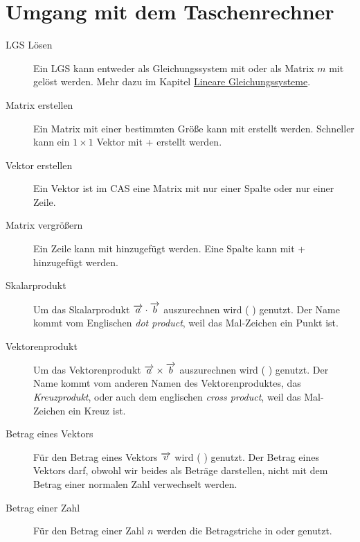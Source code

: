 \documentclass{article}
\begin{document}
\section{Umgang mit dem Taschenrechner}
\begin{description}
 \item[LGS Lösen] Ein LGS kann entweder als Gleichungssystem mit  \arrow {} \arrow {} \arrow {} oder als Matrix $m$ mit  gelöst werden. Mehr dazu im Kapitel \hyperref[Lineare Gleichungssysteme]{Lineare Gleichungssysteme}.
 \item[Matrix erstellen] Ein Matrix mit einer bestimmten Größe kann mit  \arrow {} \arrow {} \arrow {} erstellt werden. Schneller kann ein $1 \times 1$ Vektor mit  + \calckey{(} erstellt werden.
 \item[Vektor erstellen] Ein Vektor ist im CAS eine Matrix mit nur einer Spalte oder nur einer Zeile.  
 \item[Matrix vergrößern] Ein Zeile kann mit \calckey{\return} hinzugefügt werden. Eine Spalte kann mit  + \calckey{\return} hinzugefügt werden.
 \item[Skalarprodukt] Um das Skalarprodukt $\overrightarrow{a} \cdot \overrightarrow{b}$ auszurechnen wird  ( \arrow {} \arrow {} \arrow {}) genutzt. Der Name kommt vom Englischen \emph{dot product}, weil das Mal-Zeichen ein Punkt ist.
 \item[Vektorenprodukt] Um das Vektorenprodukt $\overrightarrow{a} \times \overrightarrow{b}$ auszurechnen wird  ( \arrow {} \arrow {} \arrow {}) genutzt. Der Name kommt vom anderen Namen des Vektorenproduktes, das \emph{Kreuzprodukt}, oder auch dem englischen \emph{cross product}, weil das Mal-Zeichen ein Kreuz ist.  
 \item[Betrag eines Vektors] Für den Betrag eines Vektors $\overrightarrow{v}$ wird  ( \arrow {} \arrow {} \arrow {}) genutzt. Der Betrag eines Vektors darf, obwohl wir beides als Beträge darstellen, nicht mit dem Betrag einer normalen Zahl verwechselt werden.
 \item[Betrag einer Zahl] Für den Betrag einer Zahl $n$ werden die Betragstriche in \symbols oder  genutzt. 
\end{description} 
\end{document}
